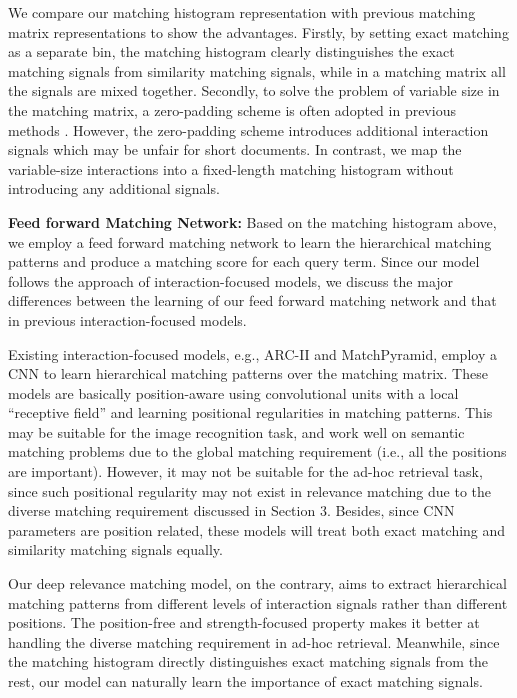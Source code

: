\documentclass{sig-alternate-05-2015}
\begin{document}
We compare our matching histogram representation with previous matching matrix representations to show the advantages. Firstly, by setting exact matching as a separate bin, the matching histogram clearly distinguishes the exact matching signals from similarity matching signals, while in a matching matrix all the signals are mixed together. Secondly, to solve the problem of variable size in the matching matrix, a zero-padding scheme is often adopted in previous methods \cite{hu2014convolutional}. However, the zero-padding scheme introduces additional interaction signals which may be unfair for short documents. In contrast, we map the variable-size interactions into a fixed-length matching histogram without introducing any additional signals. 

\textbf{Feed forward Matching Network:} Based on the matching histogram above, we employ a feed forward matching network to learn the hierarchical matching patterns and produce a matching score for each query term. Since our model follows the approach of interaction-focused models, we discuss the major differences between the learning of our feed forward matching network and that in previous interaction-focused models.

Existing interaction-focused models, e.g., ARC-II and MatchPyramid, employ a CNN to learn hierarchical matching patterns over the matching matrix. These models are basically position-aware using convolutional units with a local ``receptive field'' and learning positional regularities in matching patterns. This may be suitable for the image recognition task, and work well on semantic matching problems due to the global matching requirement (i.e., all the positions are important). However, it may not be suitable for the ad-hoc retrieval task, since such positional regularity may not exist in relevance matching due to the diverse matching requirement discussed in Section 3. Besides, since CNN parameters are position related, these models will treat both exact matching and similarity matching signals equally.

Our deep relevance matching model, on the contrary, aims to extract hierarchical matching patterns from different levels of interaction signals rather than different positions. The position-free and strength-focused property makes it better at handling the diverse matching requirement in ad-hoc retrieval. Meanwhile, since the matching histogram directly distinguishes exact matching signals from the rest, our model can naturally learn the importance of exact matching signals.
\end{document}
